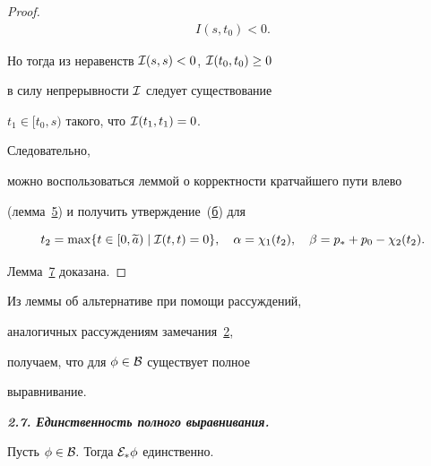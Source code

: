 \begin{proof}
\begin{multline}
{I}(s,t_0)<0.

\end{multline}

Но тогда из неравенств ${\cal I}(s,s)<0$, ${\cal I}(t_0,t_0)\ge0$

в силу непрерывности ${\cal I}$ следует существование

$t_1\in[t_0,s)$ такого, что ${\cal I}(t_1,t_1)=0$. 

Следовательно,

можно воспользоваться леммой о корректности кратчайшего пути влево

(лемма~\hyperlink{palin:lemma5}{5}) и получить утверждение~(\hyperlink{7b}{б}) для 

$$t_2=\max\{t\in[0,\widetilde{a})\mid{\cal I}(t,t)=0\},\quad \alpha=\chi_1(t_2),\quad \beta=p_*+p_0-\chi_2(t_2).$$ 

Лемма~\hyperlink{palin:lemma7}{7} доказана. \hfill \end{proof}



\smallskip



\hypertarget{palin:remark5}{}



\begin{remark}[5] Из леммы об альтернативе при помощи рассуждений,

аналогичных рассуждениям замечания~\hyperlink{palin:remark2}{2},

получаем, что для $\phi\in{\cal B}$ существует полное

выравнивание.

\end{remark}



\smallskip



{\bf \itshape 2.7. Единственность полного выравнивания.}



\hypertarget{palin:lemma8}{}



\begin{lemma}[8]Пусть $\phi\in{\cal B}.$ Тогда ${\cal E}_*\phi$ единственно$.$

\end{lemma}



\smallskip



